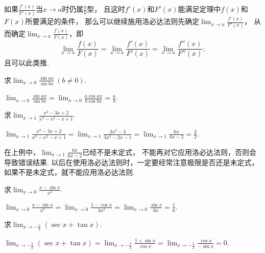 如果\(\frac{f'(x)}{F'(x)}\)当\(x \to a\)时仍属\(\frac{0}{0}\)型，
且这时\(f'(x)\)和\(F'(x)\)能满足定理中\(f(x)\)和\(F(x)\)所要满足的条件，
那么可以继续施用洛必达法则先确定\(\lim_{x \to a} \frac{f'(x)}{F'(x)}\)，
从而确定\(\lim_{x \to a} \frac{f(x)}{F(x)}\)，即\[
	\lim_{x \to a} \frac{f(x)}{F(x)}
	= \lim_{x \to a} \frac{f'(x)}{F'(x)}
	= \lim_{x \to a} \frac{f''(x)}{F''(x)};
\]
且可以此类推.

\begin{example}
求\(\lim_{x\to0} \frac{\sin ax}{\sin bx}\ (b \neq 0)\).
\begin{solution}
\(\lim_{x\to0} \frac{\sin ax}{\sin bx}
= \lim_{x\to0} \frac{a \cos ax}{b \cos bx}
= \frac{a}{b}\).
\end{solution}
\end{example}

\begin{example}
求\(\lim_{x\to1} \frac{x^3-3x+2}{x^3-x^2-x+1}\).
\begin{solution}
\(\lim_{x\to1} \frac{x^3-3x+2}{x^3-x^2-x+1}
= \lim_{x\to1} \frac{3x^2-3}{3x^2-2x-1}
= \lim_{x\to1} \frac{6x}{6x-2}
= \frac32\).
\end{solution}
\end{example}

\begin{remark}
在上例中，\(\lim_{x\to1} \frac{6x}{6x-2}\)已经不是未定式，
不能再对它应用洛必达法则，否则会导致错误结果.
以后在使用洛必达法则时，一定要经常注意极限是否还是未定式，
如果不是未定式，就不能应用洛必达法则.
\end{remark}

\begin{example}
求\(\lim_{x\to0} \frac{x-\sin x}{x^3}\).
\begin{solution}
\(\lim_{x\to0} \frac{x-\sin x}{x^3}
= \lim_{x\to0} \frac{1-\cos x}{3x^2}
= \lim_{x\to0} \frac{\sin x}{6x}
= \frac16\).
\end{solution}
\end{example}

\begin{example}
求\(\lim_{x\to-\frac\pi2} (\sec x+\tan x)\).
\begin{solution}
\(\lim_{x\to-\frac\pi2} (\sec x+\tan x)
= \lim_{x\to-\frac\pi2} \frac{1+\sin x}{\cos x}
= \lim_{x\to-\frac\pi2} \frac{\cos x}{-\sin x}
= 0\).
\end{solution}
\end{example}

